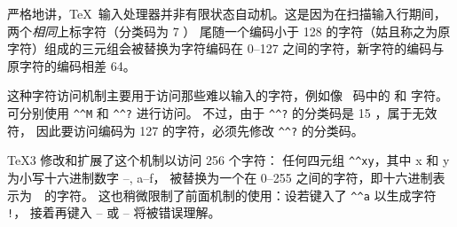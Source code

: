 \documentclass{book}
\begin{document}
严格地讲，\TeX\ 输入处理器并非有限状态自动机。这是因为在扫描输入行期间，
两个{\sl 相同\/}上标字符（分类码为 7 ）%
尾随一个编码小于 128 的字符（姑且称之为原字符）组成的三元组会被替换为字符编码在
 0--127 之间的字符，新字符的编码与原字符的编码相差 64。

这种字符访问机制主要用于访问那些难以输入的字符，例如像 \ascii\ 码中的
 和  字符。可分别使用 \verb>^^M> 和 \verb>^^?> 进行访问。
不过，由于 \verb>^^?> 的分类码是 15 ，属于无效符，
因此要访问编码为 127 的字符，必须先修改 \verb>^^?> 的分类码。

\TeX3 修改和扩展了这个机制以访问 256 个字符：
任何四元组 \verb-^^xy-，其中 \n x 和 \n y 为小写十六进制数字 --, \n a--\n f，
被替换为一个在 0--255 之间的字符，即十六进制表示为~~的字符。
这也稍微限制了前面机制的使用：设若键入了 \verb>^^a> 以生成字符 \verb>!>，
接着再键入 -- 或 -- 将被错误理解。
\end{document}
